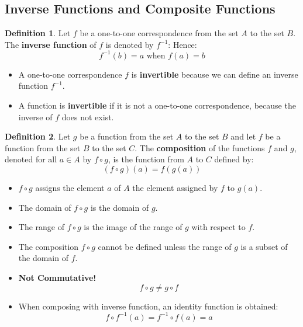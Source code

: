 \documentclass[article, 12pt]{article}
\theoremstyle{definition}
\newtheorem{definition}{Definition}[subsection]
\newcommand{\comp}{\circ} %
\begin{document}
    \subsection{Inverse Functions and Composite Functions}
    \begin{definition}
        Let $f$ be a one-to-one correspondence from the set $A$ to the set $B$. The \textbf{inverse function} of $f$ is denoted by $f^{-1}$: Hence: 
        \begin{equation*}
            f^{-1}(b) = a \text{ when } f(a) = b
        \end{equation*}
        \begin{itemize}
            \item A one-to-one correspondence $f$ is \textbf{invertible} because we can define an inverse function $f^{-1}$.
            \item A function is \textbf{invertible} if it is not a one-to-one correspondence, because the inverse of $f$ does not exist.
        \end{itemize}
    \end{definition}
    \begin{definition}
        Let $g$ be a function from the set $A$ to the set $B$ and let $f$ be a function from the set $B$ to the set $C$. The \textbf{composition} of the functions $f$ and $g$, denoted for all $a \in A$ by $f \comp g$, is the function from $A$ to $C$ defined by:
        \begin{equation*}
            (f \comp g)(a) = f(g(a))
        \end{equation*}
        \begin{itemize}
            \item $f \comp g$ assigns the element $a$ of $A$ the element assigned by $f$ to $g(a)$. 
            \item The domain of $f \comp g$ is the domain of $g$.
            \item The range of $f \comp g$ is the image of the range of $g$ with respect to $f$.
            \item The composition $f \comp g$ cannot be defined unless the range of $g$ is a subset of the domain of $f$. 
            \item \textbf{Not Commutative!} 
            \begin{equation*}
                f \comp g \neq g \comp f
            \end{equation*}
            \item When composing with inverse function, an identity function is obtained:
            \begin{equation*}
                f \comp f^{-1}(a) = f^{-1} \comp f(a) = a
            \end{equation*}
        \end{itemize}
    \end{definition}
\end{document}
